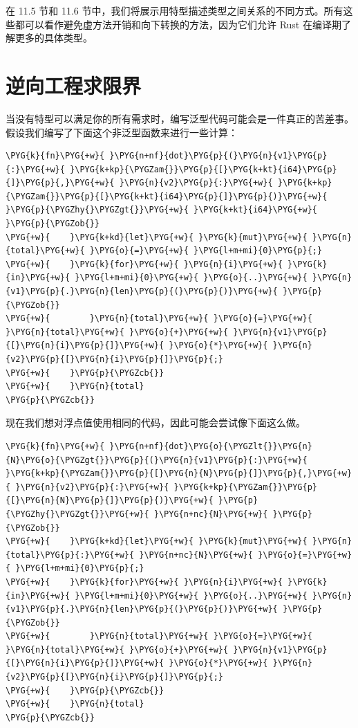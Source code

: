 在 11.5 节和 11.6 节中，我们将展示用特型描述类型之间关系的不同方式。所有这些都可以看作避免虚方法开销和向下转换的方法，因为它们允许 Rust 在编译期了解更多的具体类型。

\section{逆向工程求限界}

当没有特型可以满足你的所有需求时，编写泛型代码可能会是一件真正的苦差事。假设我们编写了下面这个非泛型函数来进行一些计算：

\begin{Verbatim}[commandchars=\\\{\},breaklines=true,breakanywhere=true,fontsize=\codefont,xleftmargin=17bp]
\PYG{k}{fn}\PYG{+w}{ }\PYG{n+nf}{dot}\PYG{p}{(}\PYG{n}{v1}\PYG{p}{:}\PYG{+w}{ }\PYG{k+kp}{\PYGZam{}}\PYG{p}{[}\PYG{k+kt}{i64}\PYG{p}{]}\PYG{p}{,}\PYG{+w}{ }\PYG{n}{v2}\PYG{p}{:}\PYG{+w}{ }\PYG{k+kp}{\PYGZam{}}\PYG{p}{[}\PYG{k+kt}{i64}\PYG{p}{]}\PYG{p}{)}\PYG{+w}{ }\PYG{p}{\PYGZhy{}\PYGZgt{}}\PYG{+w}{ }\PYG{k+kt}{i64}\PYG{+w}{ }\PYG{p}{\PYGZob{}}
\PYG{+w}{    }\PYG{k+kd}{let}\PYG{+w}{ }\PYG{k}{mut}\PYG{+w}{ }\PYG{n}{total}\PYG{+w}{ }\PYG{o}{=}\PYG{+w}{ }\PYG{l+m+mi}{0}\PYG{p}{;}
\PYG{+w}{    }\PYG{k}{for}\PYG{+w}{ }\PYG{n}{i}\PYG{+w}{ }\PYG{k}{in}\PYG{+w}{ }\PYG{l+m+mi}{0}\PYG{+w}{ }\PYG{o}{..}\PYG{+w}{ }\PYG{n}{v1}\PYG{p}{.}\PYG{n}{len}\PYG{p}{(}\PYG{p}{)}\PYG{+w}{ }\PYG{p}{\PYGZob{}}
\PYG{+w}{        }\PYG{n}{total}\PYG{+w}{ }\PYG{o}{=}\PYG{+w}{ }\PYG{n}{total}\PYG{+w}{ }\PYG{o}{+}\PYG{+w}{ }\PYG{n}{v1}\PYG{p}{[}\PYG{n}{i}\PYG{p}{]}\PYG{+w}{ }\PYG{o}{*}\PYG{+w}{ }\PYG{n}{v2}\PYG{p}{[}\PYG{n}{i}\PYG{p}{]}\PYG{p}{;}
\PYG{+w}{    }\PYG{p}{\PYGZcb{}}
\PYG{+w}{    }\PYG{n}{total}
\PYG{p}{\PYGZcb{}}
\end{Verbatim}

现在我们想对浮点值使用相同的代码，因此可能会尝试像下面这么做。

\begin{Verbatim}[commandchars=\\\{\},breaklines=true,breakanywhere=true,fontsize=\codefont,xleftmargin=17bp]
\PYG{k}{fn}\PYG{+w}{ }\PYG{n+nf}{dot}\PYG{o}{\PYGZlt{}}\PYG{n}{N}\PYG{o}{\PYGZgt{}}\PYG{p}{(}\PYG{n}{v1}\PYG{p}{:}\PYG{+w}{ }\PYG{k+kp}{\PYGZam{}}\PYG{p}{[}\PYG{n}{N}\PYG{p}{]}\PYG{p}{,}\PYG{+w}{ }\PYG{n}{v2}\PYG{p}{:}\PYG{+w}{ }\PYG{k+kp}{\PYGZam{}}\PYG{p}{[}\PYG{n}{N}\PYG{p}{]}\PYG{p}{)}\PYG{+w}{ }\PYG{p}{\PYGZhy{}\PYGZgt{}}\PYG{+w}{ }\PYG{n+nc}{N}\PYG{+w}{ }\PYG{p}{\PYGZob{}}
\PYG{+w}{    }\PYG{k+kd}{let}\PYG{+w}{ }\PYG{k}{mut}\PYG{+w}{ }\PYG{n}{total}\PYG{p}{:}\PYG{+w}{ }\PYG{n+nc}{N}\PYG{+w}{ }\PYG{o}{=}\PYG{+w}{ }\PYG{l+m+mi}{0}\PYG{p}{;}
\PYG{+w}{    }\PYG{k}{for}\PYG{+w}{ }\PYG{n}{i}\PYG{+w}{ }\PYG{k}{in}\PYG{+w}{ }\PYG{l+m+mi}{0}\PYG{+w}{ }\PYG{o}{..}\PYG{+w}{ }\PYG{n}{v1}\PYG{p}{.}\PYG{n}{len}\PYG{p}{(}\PYG{p}{)}\PYG{+w}{ }\PYG{p}{\PYGZob{}}
\PYG{+w}{        }\PYG{n}{total}\PYG{+w}{ }\PYG{o}{=}\PYG{+w}{ }\PYG{n}{total}\PYG{+w}{ }\PYG{o}{+}\PYG{+w}{ }\PYG{n}{v1}\PYG{p}{[}\PYG{n}{i}\PYG{p}{]}\PYG{+w}{ }\PYG{o}{*}\PYG{+w}{ }\PYG{n}{v2}\PYG{p}{[}\PYG{n}{i}\PYG{p}{]}\PYG{p}{;}
\PYG{+w}{    }\PYG{p}{\PYGZcb{}}
\PYG{+w}{    }\PYG{n}{total}
\PYG{p}{\PYGZcb{}}
\end{Verbatim}

